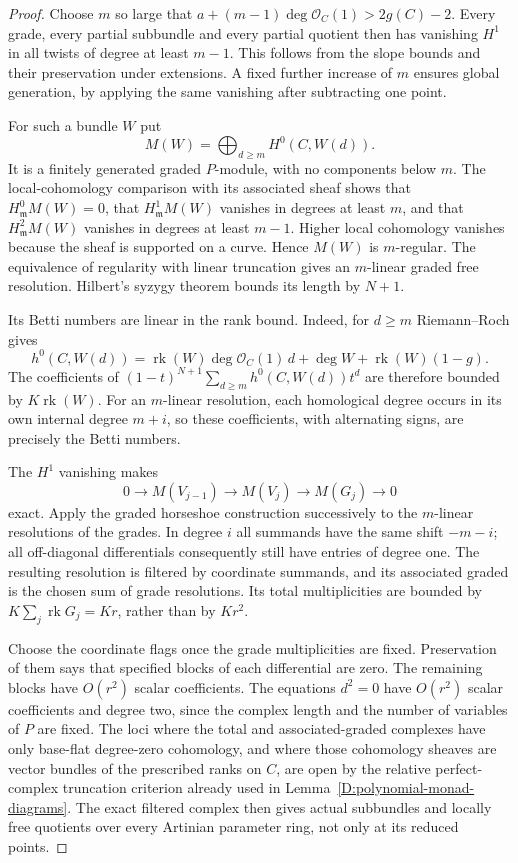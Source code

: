 \begin{proof}
Choose $m$ so large that
$a+(m-1)\deg\mathcal O_C(1)>2g(C)-2$.
Every grade, every partial subbundle and every partial quotient
then has vanishing $H^1$ in all twists of degree at least $m-1$.
This follows from the slope bounds and their preservation under
extensions.  A fixed further increase of $m$ ensures global
generation, by applying the same vanishing after subtracting
one point.

For such a bundle $W$ put
\[
          M(W)=\bigoplus_{d\ge m}H^0(C,W(d)).
\]
It is a finitely generated graded $P$-module, with no components
below $m$.  The local-cohomology comparison with its associated
sheaf shows that $H^0_{\mathfrak m}M(W)=0$, that
$H^1_{\mathfrak m}M(W)$ vanishes in degrees at least $m$,
and that $H^2_{\mathfrak m}M(W)$ vanishes in degrees at
least $m-1$.  Higher local cohomology vanishes because the
sheaf is supported on a curve.  Hence $M(W)$ is $m$-regular.
The equivalence of regularity with linear truncation
\citep[Proposition~1.1 and Theorem~1.2, pp.~95--97,
including the proof]{EisenbudGoto1984D}
gives an $m$-linear graded free resolution.
Hilbert's syzygy theorem bounds its length by $N+1$.

Its Betti numbers are linear in the rank bound.  Indeed, for
$d\ge m$ Riemann--Roch gives
\[
       h^0(C,W(d))
        =\operatorname{rk}(W)\deg\mathcal O_C(1)\,d
                      +\deg W+\operatorname{rk}(W)(1-g).
\]
The coefficients of
$(1-t)^{N+1}\sum_{d\ge m}h^0(C,W(d))t^d$
are therefore bounded by $K\operatorname{rk}(W)$.
For an $m$-linear resolution, each homological degree
occurs in its own internal degree $m+i$, so these
coefficients, with alternating signs, are precisely
the Betti numbers.

The $H^1$ vanishing makes
\[
 0\to M(V_{j-1})\to M(V_j)\to M(G_j)\to0
\]
exact.  Apply the graded horseshoe construction successively
to the $m$-linear resolutions of the grades.  In degree $i$
all summands have the same shift $-m-i$; all off-diagonal
differentials consequently still have entries of degree one.
The resulting resolution is filtered by coordinate summands,
and its associated graded is the chosen sum of grade resolutions.
Its total multiplicities are bounded by
$K\sum_j\operatorname{rk}G_j=Kr$, rather than by $Kr^2$.

Choose the coordinate flags once the grade multiplicities
are fixed.  Preservation of them says that specified blocks
of each differential are zero.  The remaining blocks have
$O(r^2)$ scalar coefficients.  The equations $d^2=0$ have
$O(r^2)$ scalar coefficients and degree two, since the
complex length and the number of variables of $P$ are fixed.
The loci where the total and associated-graded complexes
have only base-flat degree-zero cohomology, and where
those cohomology sheaves are vector bundles of the
prescribed ranks on $C$, are open by the relative
perfect-complex truncation criterion already used in
Lemma~\ref{D:polynomial-monad-diagrams}.
The exact filtered complex then gives actual subbundles
and locally free quotients over every Artinian parameter
ring, not only at its reduced points.


\end{proof}
